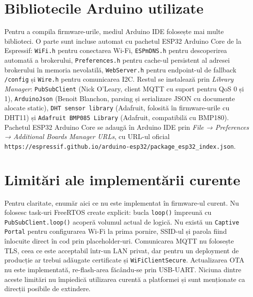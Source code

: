 \FloatBarrier
\section{Bibliotecile Arduino utilizate}
Pentru a compila firmware-urile, mediul Arduino IDE folosește mai multe biblioteci. O parte sunt incluse automat cu pachetul ESP32 Arduino Core de la Espressif: \texttt{WiFi.h} pentru conectarea Wi-Fi, \texttt{ESPmDNS.h} pentru descoperirea automată a brokerului, \texttt{Preferences.h} pentru cache-ul persistent al adresei brokerului în memoria nevolatilă, \texttt{WebServer.h} pentru endpoint-ul de fallback \texttt{/config} și \texttt{Wire.h} pentru comunicarea I2C. Restul se instalează prin \emph{Library Manager}: \texttt{PubSubClient} (Nick O'Leary, client MQTT cu suport pentru QoS 0 și 1), \texttt{ArduinoJson} (Benoit Blanchon, parsing și serializare JSON cu documente alocate static), \texttt{DHT sensor library} (Adafruit, folosită în firmware-urile cu DHT11) și \texttt{Adafruit BMP085 Library} (Adafruit, compatibilă cu BMP180). Pachetul ESP32 Arduino Core se adaugă în Arduino IDE prin \emph{File → Preferences → Additional Boards Manager URLs}, cu URL-ul oficial \texttt{https://espressif.github.io/arduino-esp32/package\_esp32\_index.json}.

\section{Limitări ale implementării curente}
Pentru claritate, enumăr aici ce nu este implementat în firmware-ul curent. Nu folosesc task-uri FreeRTOS create explicit: bucla \texttt{loop()} împreună cu \texttt{PubSubClient.loop()} acoperă volumul actual de logică. Nu există un \texttt{Captive Portal} pentru configurarea Wi-Fi la prima pornire, SSID-ul și parola fiind înlocuite direct în cod prin placeholder-uri. Comunicarea MQTT nu folosește TLS, ceea ce este acceptabil într-un LAN privat, dar pentru un deployment de producție ar trebui adăugate certificate și \texttt{WiFiClientSecure}. Actualizarea OTA nu este implementată, re-flash-area făcându-se prin USB-UART. Niciuna dintre aceste limitări nu împiedică utilizarea curentă a platformei și sunt menționate ca direcții posibile de extindere.